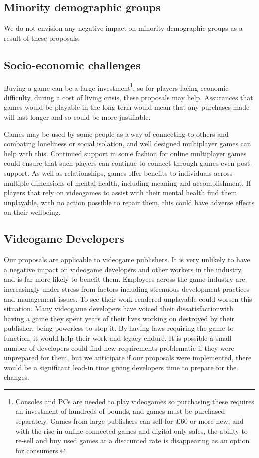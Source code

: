 \subsection{Minority demographic groups}
We do not envision any negative impact on minority demographic groups as a result of these proposals.

\subsection{Socio-economic challenges}
Buying a game can be a large investment\footnote{
    Consoles and PCs are needed to play videogames so purchasing these requires an investment of hundreds of pounds,
    and games must be purchased separately.
    Games from large publishers can sell for £60 or more new,
    and with the rise in online connected games and digital only sales,
    the ability to re-sell and buy used games at a discounted rate is disappearing as an option for consumers.
}, so for players facing economic difficulty, during a cost of living crisis, these proposals may help.
Assurances that games would be playable in the long term would mean that any purchases made will last longer and so could be more justifiable.

Games may be used by some people as a way of connecting to others and combating loneliness or social isolation,
and well designed multiplayer games can help with this\cite{design-friends-2018}.
Continued support in some fashion for online multiplayer games could ensure that such players can continue to connect through games even post-support.
As well as relationships, games offer benefits to individuals across multiple dimensions of mental health,
including meaning and accomplishment\cite{gaming-wellbeing-2014}.
If players that rely on videogames to assist with their mental health find them unplayable, with no action possible to repair them,
this could have adverse effects on their wellbeing.

\subsection{Videogame Developers}
Our proposals are applicable to videogame publishers.
It is very unlikely to have a negative impact on videogame developers and other workers in the industry, and is far more likely to benefit them.
Employees across the game industry are increasingly under stress from factors including strenuous development practices and management issues\cite{industry-stress-2020}.
To see their work rendered unplayable could worsen this situation.
Many videogame developers have voiced their dissatisfaction\cn with having a game they spent years of their lives working on destroyed by their publisher, being powerless to stop it.
By having laws requiring the game to function, it would help their work and legacy endure.
It is possible a small number of developers could find new requirements problematic if they were unprepared for them,
but we anticipate if our proposals were implemented, there would be a significant lead-in time giving developers time to prepare for the changes.

